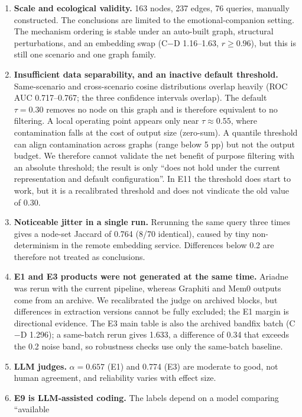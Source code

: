 \documentclass[11pt]{article}
\begin{document}
\begin{enumerate}
  \item \textbf{Scale and ecological validity.} 163 nodes, 237 edges, 76 queries, manually
        constructed. The conclusions are limited to the emotional-companion setting. The mechanism
        ordering is stable under an auto-built graph, structural perturbations, and an embedding
        swap (C$-$D 1.16--1.63, $r\ge0.96$), but this is still one scenario and one graph family.
  \item \textbf{Insufficient data separability, and an inactive default threshold.}
        Same-scenario and cross-scenario cosine distributions overlap heavily (ROC AUC
        0.717--0.767; the three confidence intervals overlap). The default $\tau=0.30$ removes no
        node on this graph and is therefore equivalent to no filtering. A local operating point
        appears only near $\tau\approx0.55$, where contamination falls at the cost of output size
        (zero-sum). A quantile threshold can align contamination across graphs (range below 5 pp)
        but not the output budget. We therefore cannot validate the net benefit of purpose
        filtering with an absolute threshold; the result is only ``does not hold under the current
        representation and default configuration''. In E11 the threshold does start to work, but
        it is a recalibrated threshold and does not vindicate the old value of 0.30.
  \item \textbf{Noticeable jitter in a single run.} Rerunning the same query three times gives a
        node-set Jaccard of 0.764 (8/70 identical), caused by tiny non-determinism in the remote
        embedding service. Differences below 0.2 are therefore not treated as conclusions.
  \item \textbf{E1 and E3 products were not generated at the same time.} Ariadne was rerun with
        the current pipeline, whereas Graphiti and Mem0 outputs come from an archive. We
        recalibrated the judge on archived blocks, but differences in extraction versions cannot
        be fully excluded; the E1 margin is directional evidence. The E3 main table is also the
        archived bandfix batch (C$-$D 1.296); a same-batch rerun gives 1.633, a difference of 0.34
        that exceeds the 0.2 noise band, so robustness checks use only the same-batch baseline.
  \item \textbf{LLM judges.} $\alpha=0.657$ (E1) and 0.774 (E3) are moderate to good, not human
        agreement, and reliability varies with effect size.
  \item \textbf{E9 is LLM-assisted coding.} The labels depend on a model comparing ``available

\end{enumerate}
\end{document}
